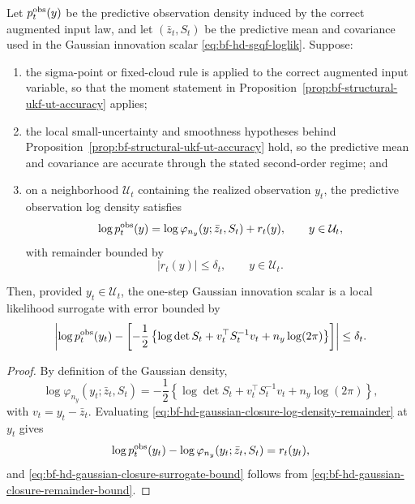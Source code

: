 \begin{proposition}
\label{prop:bf-hd-gaussian-closure-surrogate-regime}
Let \(p_t^{\rm obs}(y)\) be the predictive observation density induced by the
correct augmented input law, and let \((\bar z_t,S_t)\) be the predictive mean
and covariance used in the Gaussian innovation scalar
\eqref{eq:bf-hd-sgqf-loglik}.  Suppose:
\begin{enumerate}[label=(\roman*), leftmargin=0.28in]
  \item the sigma-point or fixed-cloud rule is applied to the correct augmented
    input variable, so that the moment statement in
    Proposition~\ref{prop:bf-structural-ukf-ut-accuracy} applies;
  \item the local small-uncertainty and smoothness hypotheses behind
    Proposition~\ref{prop:bf-structural-ukf-ut-accuracy} hold, so the predictive
    mean and covariance are accurate through the stated second-order regime; and
  \item on a neighborhood \(\mathcal U_t\) containing the realized observation
    \(y_t\), the predictive observation log density satisfies
    \begin{equation}
      \log p_t^{\rm obs}(y)
      =
      \log \varphi_{n_y}(y;\bar z_t,S_t)+r_t(y),
      \qquad y\in\mathcal U_t,
      \label{eq:bf-hd-gaussian-closure-log-density-remainder}
    \end{equation}
    with remainder bounded by
    \begin{equation}
      |r_t(y)|\le \delta_t,
      \qquad y\in\mathcal U_t.
      \label{eq:bf-hd-gaussian-closure-remainder-bound}
    \end{equation}
\end{enumerate}
Then, provided \(y_t\in\mathcal U_t\), the one-step Gaussian innovation scalar
is a local likelihood surrogate with error bounded by
\begin{equation}
  \left|
    \log p_t^{\rm obs}(y_t)
    -
    \left[-\frac12\left\{\log\det S_t+v_t^\top S_t^{-1}v_t+n_y\log(2\pi)\right\}\right]
  \right|
  \le \delta_t.
  \label{eq:bf-hd-gaussian-closure-surrogate-bound}
\end{equation}
\end{proposition}

\begin{proof}
By definition of the Gaussian density,
\[
  \log \varphi_{n_y}(y_t;\bar z_t,S_t)
  =
  -\frac12\left\{\log\det S_t+v_t^\top S_t^{-1}v_t+n_y\log(2\pi)\right\},
\]
with \(v_t=y_t-\bar z_t\).  Evaluating
\eqref{eq:bf-hd-gaussian-closure-log-density-remainder} at \(y_t\) gives
\begin{equation}
  \log p_t^{\rm obs}(y_t)
  -
  \log \varphi_{n_y}(y_t;\bar z_t,S_t)
  =
  r_t(y_t),
\end{equation}
and \eqref{eq:bf-hd-gaussian-closure-surrogate-bound} follows from
\eqref{eq:bf-hd-gaussian-closure-remainder-bound}.
\end{proof}

